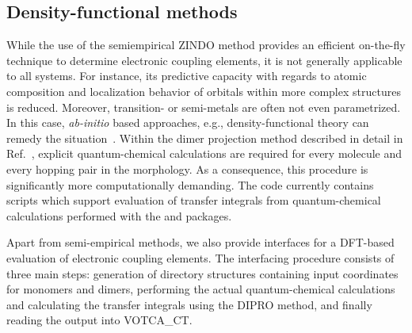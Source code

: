 \subsection{Density-functional methods}
\label{sec:dft}

While the use of the semiempirical ZINDO method provides an efficient on-the-fly technique to determine electronic coupling elements, it is not generally applicable to all systems. For instance, its predictive capacity with regards to atomic composition and localization behavior of orbitals within more complex structures is reduced. Moreover, transition- or semi-metals are often not even parametrized. In this case, {\it ab-initio} based approaches, e.g., density-functional theory can remedy the situation~\cite{huang_intermolecular_2004,huang_validation_2005,valeev_effect_2006,yin_balanced_2006,yang_theoretical_2007,baumeier_density-functional_2010}. Within the dimer projection method described in detail in Ref.~\cite{baumeier_density-functional_2010}, explicit quantum-chemical calculations are required for every molecule and every hopping pair in the morphology. As a consequence, this procedure is significantly more computationally demanding. The code currently contains scripts which support evaluation of transfer integrals from quantum-chemical calculations performed with the \gaussian and \turbomole packages.

Apart from semi-empirical methods, we also provide interfaces for a DFT-based evaluation of electronic coupling elements. The interfacing procedure consists of three main steps: generation of directory structures containing input coordinates for monomers and dimers, performing the actual quantum-chemical calculations and calculating the transfer integrals using the DIPRO method, and finally reading the output into VOTCA\_CT.

